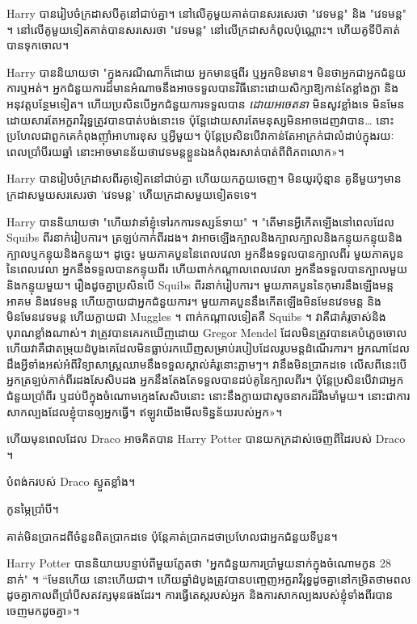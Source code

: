 {Harry បានរៀបចំក្រដាសបីគូនៅជាប់គ្នា។ នៅលើគូមួយគាត់បានសរសេរថា "វេទមន្ត" និង "វេទមន្ត" ។ នៅលើគូមួយទៀតគាត់បានសរសេរថា "វេទមន្ត" នៅលើក្រដាសកំពូលប៉ុណ្ណោះ។ ហើយគូទីបីគាត់បានទុកចោល។

Harry បាននិយាយថា "ក្នុងករណីណាក៏ដោយ អ្នកមានថ្មពីរ ឬអ្នកមិនមាន។ មិនថាអ្នកជាអ្នកជំនួយការឬអត់។ អ្នកជំនួយការដ៏មានអំណាចនឹងអាចទទួលបានវិធីនោះដោយសិក្សាឱ្យកាន់តែខ្លាំងក្លា និងអនុវត្តបន្ថែមទៀត។ ហើយប្រសិនបើអ្នកជំនួយការទទួលបាន \emph{ដោយអចេតនា} មិនសូវខ្លាំងទេ មិនមែនដោយសារតែអក្ខរាវិរុទ្ធត្រូវបានបាត់បង់នោះទេ ប៉ុន្តែដោយសារតែមនុស្សមិនអាចដេញវាបាន… នោះប្រហែលជាពួកគេកំពុងញ៉ាំអាហារខុស ឬអ្វីមួយ។ ប៉ុន្តែ​ប្រសិន​បើ​វា​កាន់តែ​អាក្រក់​ជា​លំដាប់​ក្នុង​រយៈពេល​ប្រាំបី​រយ​ឆ្នាំ នោះ​អាច​មាន​ន័យ​ថា​វេទមន្ត​ខ្លួន​ឯង​កំពុង​រសាត់​បាត់​ពី​ពិភព​លោក»។

Harry បានរៀបចំក្រដាសពីរគូទៀតនៅជាប់គ្នា ហើយយកភួយចេញ។ មិនយូរប៉ុន្មាន គូនីមួយៗមានក្រដាសមួយសរសេរថា 'វេទមន្ត' ហើយក្រដាសមួយទៀតទទេ។

Harry បាននិយាយថា "ហើយវានាំខ្ញុំទៅរកការទស្សន៍ទាយ" ។ "តើមានអ្វីកើតឡើងនៅពេលដែល Squibs ពីរនាក់រៀបការ។ ត្រឡប់កាក់ពីរដង។ វាអាចឡើងក្បាលនិងក្បាលក្បាលនិងកន្ទុយកន្ទុយនិងក្បាលឬកន្ទុយនិងកន្ទុយ។ ដូច្នេះ មួយភាគបួននៃពេលវេលា អ្នកនឹងទទួលបានក្បាលពីរ មួយភាគបួននៃពេលវេលា អ្នកនឹងទទួលបានកន្ទុយពីរ ហើយពាក់កណ្តាលពេលវេលា អ្នកនឹងទទួលបានក្បាលមួយ និងកន្ទុយមួយ។ រឿងដូចគ្នាប្រសិនបើ Squibs ពីរនាក់រៀបការ។ មួយភាគបួននៃកុមារនឹងឡើងមន្តអាគម និងវេទមន្ត ហើយក្លាយជាអ្នកជំនួយការ។ មួយភាគបួននឹងកើតឡើងមិនមែនវេទមន្ត និងមិនមែនវេទមន្ត ហើយក្លាយជា Muggles ។ ពាក់កណ្តាលទៀតគឺ Squibs ។ វា​គឺ​ជា​គំរូ​ចាស់​និង​បុរាណ​ខ្លាំង​ណាស់។ វាត្រូវបានគេរកឃើញដោយ Gregor Mendel ដែលមិនត្រូវបានគេបំភ្លេចចោល ហើយវាគឺជាតម្រុយដំបូងគេដែលមិនធ្លាប់រកឃើញសម្រាប់របៀបដែលរូបមន្តដំណើរការ។ អ្នក​ណា​ដែល​ដឹង​អ្វី​ទាំងអស់​អំពី​វិទ្យាសាស្ត្រ​ឈាម​នឹង​ទទួល​ស្គាល់​គំរូ​នោះ​ភ្លាមៗ។ វា​នឹង​មិន​ប្រាកដ​ទេ លើស​ពី​នេះ​បើ​អ្នក​ត្រឡប់​កាក់​ពីរដង​សែសិប​ដង អ្នក​នឹង​តែងតែ​ទទួលបាន​ដប់​គូ​នៃ​ក្បាល​ពីរ។ ប៉ុន្តែប្រសិនបើវាជាអ្នកជំនួយប្រាំពីរ ឬដប់បីក្នុងចំណោមក្មេងសែសិបនោះ នោះនឹងក្លាយជាសូចនាករដ៏រឹងមាំមួយ។ នោះ​ជា​ការ​សាកល្បង​ដែល​ខ្ញុំ​បាន​ឲ្យ​អ្នក​ធ្វើ។ ឥឡូវ​យើង​មើល​ទិន្នន័យ​របស់​អ្នក»។

ហើយមុនពេលដែល Draco អាចគិតបាន Harry Potter បានយកក្រដាស់ចេញពីដៃរបស់ Draco ។

បំពង់ករបស់ Draco ស្ងួតខ្លាំង។

កូនម្ភៃប្រាំបី។

គាត់​មិន​ប្រាកដ​ពី​ចំនួន​ពិតប្រាកដ​ទេ ប៉ុន្តែ​គាត់​ប្រាកដ​ថា​ប្រហែល​ជា​អ្នក​ជំនួយ​ទី​បួន​។

Harry Potter បាននិយាយបន្ទាប់ពីមួយភ្លែតថា "អ្នកជំនួយការប្រាំមួយនាក់ក្នុងចំណោមកូន 28 នាក់" ។ “មែនហើយ នោះហើយជា។ ហើយឆ្នាំដំបូងត្រូវបានបញ្ចេញអក្ខរាវិរុទ្ធដូចគ្នានៅកម្រិតថាមពលដូចគ្នាកាលពីប្រាំបីសតវត្សមុនផងដែរ។ ការ​ធ្វើ​តេស្ត​របស់​អ្នក និង​ការ​សាកល្បង​របស់​ខ្ញុំ​ទាំង​ពីរ​បាន​ចេញ​មក​ដូច​គ្នា»។

}
